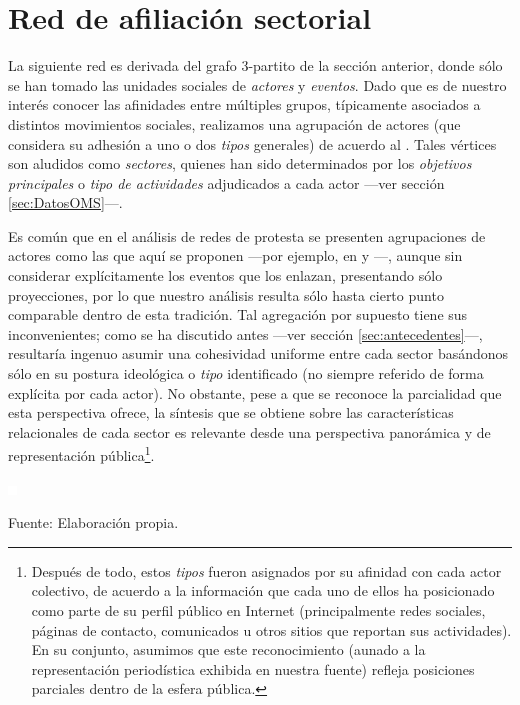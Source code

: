 \documentclass[letterpaper, 11pt]{book}
\theoremstyle{definition}
\theoremstyle{remark}
\begin{document}
\section{Red de afiliación sectorial}
\label{sec:RedAgregada_TiposEps}

La siguiente red es derivada del grafo 3-partito de la sección anterior, donde sólo se han tomado las unidades sociales de \emph{actores} y \emph{eventos}. 
Dado que es de nuestro interés conocer las afinidades entre múltiples grupos, típicamente asociados a distintos movimientos sociales, realizamos una agrupación de actores (que considera su adhesión a uno o dos \emph{tipos} generales) de acuerdo al . 
Tales vértices son aludidos como \emph{sectores}, quienes han sido determinados por los \emph{objetivos principales} o \emph{tipo de actividades} adjudicados a cada actor ---ver sección \ref{sec:DatosOMS}---. 


Es común que en el análisis de redes de protesta se presenten agrupaciones de actores como las que aquí se proponen ---por ejemplo, en \citet{2003_Wada_Tesis} y \citet{1993_BrmanEvtt_StructureSocialProtest}---, aunque sin considerar explícitamente los eventos que los enlazan, presentando sólo proyecciones, por lo que nuestro análisis resulta sólo hasta cierto punto comparable dentro de esta tradición. 
Tal agregación por supuesto tiene sus inconvenientes; como se ha discutido antes ---ver sección \ref{sec:antecedentes}---, resultaría ingenuo asumir una cohesividad uniforme entre cada sector basándonos sólo en su postura ideológica o \emph{tipo} identificado (no siempre referido de forma explícita por cada actor). 
No obstante, pese a que se reconoce la parcialidad que esta perspectiva ofrece, la síntesis que se obtiene sobre las características relacionales de cada sector es relevante desde una perspectiva panorámica y de representación pública\footnote{
    Después de todo, estos \emph{tipos} fueron asignados por su afinidad con cada actor colectivo, de acuerdo a la información que cada uno de ellos ha posicionado como parte de su perfil público en Internet (principalmente redes sociales, páginas de contacto, comunicados u otros sitios que reportan sus actividades). 
    En su conjunto, asumimos que este reconocimiento (aunado a la representación periodística exhibida en nuestra fuente) refleja posiciones parciales dentro de la esfera pública. 
}. 

\newpage
\begin{minipage}{\linewidth}
\centering
{} \label{4_9_red_tiposEps}

\includegraphics[scale=0.1]{img/null.png}
\vspace{42em}
\par\bigskip
\small Fuente: Elaboración propia.
\end{minipage}\bigskip
\end{document}
